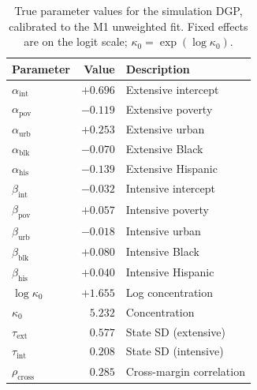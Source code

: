 \begin{table}[htbp]
  \centering
  \small
  \begin{tabular}{@{}l r l@{}}
    \toprule
    Parameter & Value & Description \\
    \midrule
    $\alpha_{\text{int}}$     & $+0.696$ & Extensive intercept \\
    $\alpha_{\text{pov}}$     & $-0.119$ & Extensive poverty \\
    $\alpha_{\text{urb}}$     & $+0.253$ & Extensive urban \\
    $\alpha_{\text{blk}}$     & $-0.070$ & Extensive Black \\
    $\alpha_{\text{his}}$     & $-0.139$ & Extensive Hispanic \\
    \addlinespace
    $\beta_{\text{int}}$      & $-0.032$ & Intensive intercept \\
    $\beta_{\text{pov}}$      & $+0.057$ & Intensive poverty \\
    $\beta_{\text{urb}}$      & $-0.018$ & Intensive urban \\
    $\beta_{\text{blk}}$      & $+0.080$ & Intensive Black \\
    $\beta_{\text{his}}$      & $+0.040$ & Intensive Hispanic \\
    \addlinespace
    $\log\kappa_0$            & $+1.655$ & Log concentration \\
    $\kappa_0$                & $5.232$ & Concentration \\
    \addlinespace
    $\tau_{\text{ext}}$       & $0.577$ & State SD (extensive) \\
    $\tau_{\text{int}}$       & $0.208$ & State SD (intensive) \\
    $\rho_{\text{cross}}$     & $0.285$ & Cross-margin correlation \\
    \bottomrule
  \end{tabular}
  \caption{True parameter values for the simulation DGP, calibrated to
    the M1 unweighted fit.  Fixed effects are on the logit scale;
    $\kappa_0 = \exp(\log\kappa_0)$.}
  \label{smf:tab-truth}
\end{table}

